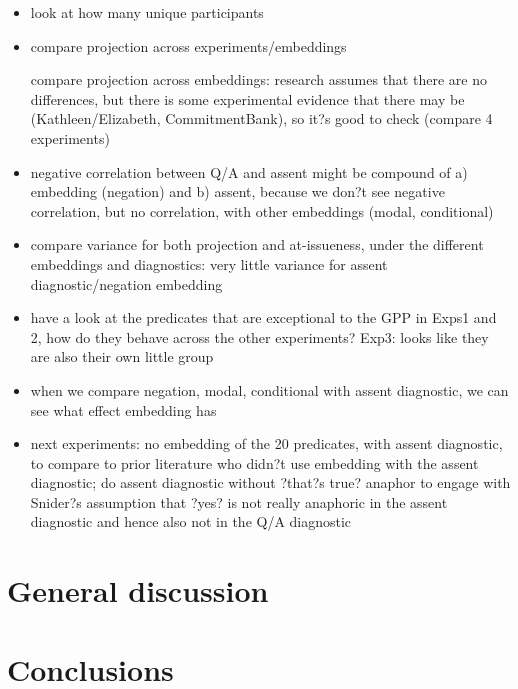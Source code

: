 \documentclass[11pt,fleqn]{article}
\newcommand{\6}{\mbox{$[\hspace*{-.6mm}[$}}
\newcommand{\9}{\mbox{$]\hspace*{-.6mm}]$}}
\begin{document}
\begin{itemize}
\item look at how many unique participants

\item compare projection across experiments/embeddings

compare projection across embeddings: research assumes that there are no differences, but there is some experimental evidence that there may be (Kathleen/Elizabeth, CommitmentBank), so it?s good to check (compare 4 experiments)

\item negative correlation between Q/A and assent might be compound of a) embedding (negation) and b) assent, because we don?t see negative correlation, but no correlation, with other embeddings (modal, conditional)

\item  compare variance for both projection and at-issueness, under the different embeddings and diagnostics: very little variance for assent diagnostic/negation embedding

\item have a look at the predicates that are exceptional to the GPP in Exps1 and 2, how do they behave across the other experiments? Exp3: looks like they are also their own little group

\item  when we compare negation, modal, conditional with assent diagnostic, we can see what effect embedding has

\item next experiments: no embedding of the 20 predicates, with assent diagnostic, to compare to prior literature who didn?t use embedding with the assent diagnostic; do assent diagnostic without ?that?s true? anaphor to engage with Snider?s assumption that ?yes? is not really anaphoric in the assent diagnostic and hence also not in the Q/A diagnostic

\end{itemize}

\section{General discussion}\label{s4}

\section{Conclusions}\label{s5}
\end{document}

